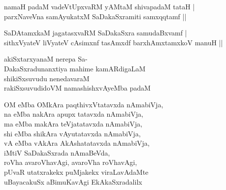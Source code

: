 \begin{entry}
\begin{shl}
namaH padaM vadeVtUpxvaRM yAMtaM shivapadaM tataH |\\
parxNaveVna samAyukatxM SaDakaSxramiti samxqqtamf ||
\end{shl}
\begin{shl}
SaDAtamxkaM jagatasxvaRM SaDakaSxra samudaBxvamf |\\
sithxVyateV liVyateV cAsimxnf tasAmxdf barxhAmxtamxkoV manuH ||
\end{shl}

\gl{}
\begin{shl}
akiSxtarxyanaM nerepa Sa-\\
DakaSxradunanxtiya mahime kamARdigaLaM\\
shikiSxsuvudu nenedavaraM\\
rakiSxsuvudidoVM namashishxvAyeMba padaM
\end{shl}
\gl{}
\begin{shl}
OM eMba OMkAra paqthivxVtatavxda nAmabiVja,\\
na eMba nakAra apupx tatavxda nAmabiVja,\\
ma eMba makAra teVjatatavxda nAmabiVja,\\
shi eMba shikAra vAyutatavxda nAmabiVja,\\
vA eMba vAkAra AkAshatatavxda nAmabiVja,\\
iMtiV SaDakaSxrada nAmaBeVda,\\
roVha avaroVhavAgi, avaroVha roVhavAgi,\\
pUvaR utatxrakekx puMjakekx viraLavAdaMte\\
uBayacakuSx aBimuKavAgi EkAkaSxradalilx\\

\end{shl}
\end{entry}
